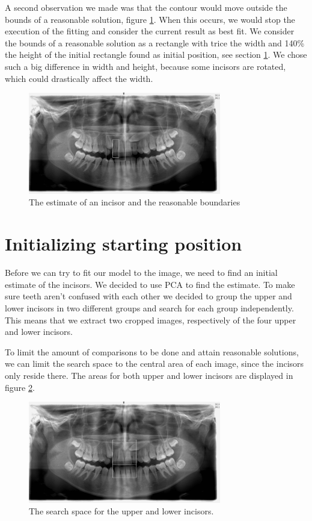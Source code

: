 \documentclass[a4paper,10pt]{article}
\begin{document}
A second observation we made was that the contour would move outside the bounds of a reasonable solution, figure \ref{fig:twoBoxes}. When this occurs, we would stop the execution of the fitting and consider the current result as best fit. We consider the bounds of a reasonable solution as a rectangle with trice the width and 140\% the height of the initial rectangle found as initial position, see section \ref{sec:initial}. We chose such a big difference in width and height, because some incisors are rotated, which could drastically affect the width.

\begin{figure}[h!]
  \centering
    \includegraphics[width=0.75\textwidth]{images/twoBoxes.jpg}
  \caption{The estimate of an incisor and the reasonable boundaries}
  \label{fig:twoBoxes}
\end{figure}

\section{Initializing starting position}\label{sec:initial}
Before we can try to fit our model to the image, we need to find an initial estimate of the incisors. We decided to use PCA to find the estimate.
To make sure teeth aren't confused with each other we decided to group the upper and lower incisors in two different groups and search for each group independently. This means that we extract two cropped images, respectively of the four upper and lower incisors.

To limit the amount of comparisons to be done and attain reasonable solutions, we can limit the search space to the central area of each image, since the incisors only reside there. The areas for both upper and lower incisors are displayed in figure \ref{fig:PCAsearch}.

\begin{figure}[h!]
  \centering
    \includegraphics[width=0.75\textwidth]{images/searchSpace.jpg}
  \caption{The search space for the upper and lower incisors.}
  \label{fig:PCAsearch}
\end{figure}
\end{document}
